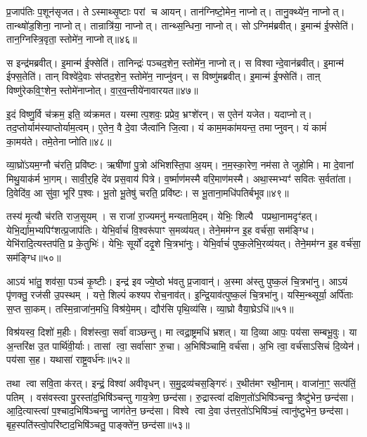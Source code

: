 प्र॒जाप॑तिः प॒शून॑सृजत।
तेऽस्माथ्सृ॒ष्टाः परां च आयन्।
तान॑ग्निष्टो॒मेन॒ नाप्नोत्।
तानु॒क्थ्ये॑न॒ नाप्नोत्।
तान्थ्षो॑ड॒शिना॒ नाप्नोत्।
तान्रात्रि॑या॒ नाप्नोत्।
तान्थ्स॒न्धिना॒ नाप्नोत्।
सोऽग्निम॑ब्रवीत्।
इ॒मान्म॑ ई॒फ्सेति॑।
तान॒ग्निस्त्रि॒वृता॒ स्तोमे॑न॒ नाप्नोत्॥४६॥

स इन्द्र॑मब्रवीत्।
इ॒मान्म॑ ई॒फ्सेति॑।
तानिन्द्रः॑ पञ्चद॒शेन॒ स्तोमे॑न॒ नाप्नोत्।
स विश्वान्दे॒वान॑ब्रवीत्।
इ॒मान्म॑ ईफ्स॒तेति॑।
तान् विश्वे॑दे॒वाः स॑प्तद॒शेन॒ स्तोमे॑न॒ नाप्नु॑वन्।
स विष्णु॑मब्रवीत्।
इ॒मान्म॑ ई॒फ्सेति॑।
ताऩ् विष्णु॑रेकवि॒ꣳ॒शेन॒ स्तोमे॑नाप्नोत्।
वा॒र॒व॒न्तीये॑नावारयत॥४७॥

इ॒दं विष्णु॒र्वि च॑क्रम॒ इति॒ व्य॑क्रमत।
यस्मात्प॒शवः॒ प्रप्रेव॒ भ्रꣳशे॑रन्।
स ए॒तेन॑ यजेत।
यदाप्नोत्।
तद॒प्तोर्याम॑स्याप्तोर्याम॒\-त्वम्।
ए॒तेन॒ वै दे॒वा जैत्वा॑नि जि॒त्वा।
यं काम॒मका॑मयन्त॒ तमाप्नुवन्।
यं कामं॑ का॒मय॑ते।
तमे॒तेनाप्नोति॥४८॥\anuvakamend[स्तोमे॑न॒ नाप्नो॑दवारयत॒ नव॑ च]

व्या॒घ्रो॑\-ऽयम॒ग्नौ च॑रति॒ प्रवि॑ष्टः।
ऋषी॑णां पु॒त्रो अ॑भिशस्ति॒पा अ॒यम्।
न॒म॒स्का॒रेण॒ नम॑सा ते जुहोमि।
मा दे॒वानां मिथु॒याक॑र्म भा॒गम्।
सावी॒र्॒हि दे॑व प्रस॒वाय॑ पित्रे।
व॒र्ष्माण॑मस्मै वरि॒माण॑मस्मै।
अथा॒स्मभ्यꣳ॑ सवितः स॒र्वता॑ता।
दि॒वेदि॑व॒ आ सु॑वा॒ भूरि॑ प॒श्वः।
भू॒तो भू॒तेषु॑ चरति॒ प्रवि॑ष्टः।
स भू॒ताना॒मधि॑पतिर्बभूव॥४९॥

तस्य॑ मृ॒त्यौ च॑रति राज॒सूयम्।
स राजा॑ रा॒ज्यमनु॑ मन्यतामि॒दम्।
येभिः॒ शिल्पै पप्रथा॒नामदृꣳ॑हत्।
येभि॒र्द्याम॒भ्यपिꣳ॑शत्प्र॒जाप॑तिः।
येभि॒र्वाचं॑ वि॒श्वरू॑पाꣳ स॒मव्य॑यत्।
तेने॒मम॑ग्न इ॒ह वर्च॑सा॒ सम॑ङ्ग्धि।
येभि॑रादि॒त्यस्तप॑ति॒ प्र के॒तुभिः॑।
येभिः॒ सूर्यो॑ ददृ॒शे चि॒त्रभा॑नुः।
येभि॒र्वाचं॑ पुष्क॒लेभि॒रव्य॑यत्।
तेने॒मम॑ग्न इ॒ह वर्च॑सा॒ सम॑ङ्ग्धि॥५०॥

आऽयं भा॑तु॒ शव॑सा॒ पञ्च॑ कृ॒ष्टीः।
इन्द्र॑ इव ज्ये॒ष्ठो भ॑वतु प्र॒जावान्॑।
अ॒स्मा अ॑स्तु पुष्क॒लं चि॒त्रभा॑नु।
आऽयं पृ॑णक्तु॒ रज॑सी उ॒पस्थम्।
यत्ते॒ शिल्पं॑ कश्यप रोच॒नाव॑त्।
इ॒न्द्रि॒याव॑त्पुष्क॒लं चि॒त्रभा॑नु।
यस्मि॒न्थ्सूर्या॒ अर्पि॑ताः स॒प्त सा॒कम्।
तस्मि॒न्राजा॑न॒मधि॒ विश्र॑ये॒मम्।
द्यौर॑सि पृथि॒व्य॑सि।
व्या॒घ्रो वैया॒घ्रे\-ऽधि॑॥५१॥

विश्र॑यस्व॒ दिशो॑ म॒हीः।
विश॑स्त्वा॒ सर्वा॑ वाञ्छन्तु।
मा त्वद्रा॒ष्ट्रमधि॑ भ्रशत्।
या दि॒व्या आपः॒ पय॑सा सम्बभू॒वुः।
या अ॒न्तरि॑क्ष उ॒त पार्थि॑वी॒र्याः।
तासां त्वा॒ सर्वा॑साꣳ रु॒चा।
अ॒भिषि॑ञ्चामि॒ वर्च॑सा।
अ॒भि त्वा॒ वर्च॑सा\-ऽसिचं दि॒व्येन॑।
पय॑सा स॒ह।
यथासा॑ राष्ट्र॒वर्ध॑नः॥५२॥

तथा त्वा सवि॒ता क॑रत्।
इन्द्रं॒ विश्वा॑ अवीवृधन्।
स॒मु॒द्रव्य॑चस॒ङ्गिरः॑।
र॒थीत॑मꣳ रथी॒नाम्।
वाजा॑ना॒ꣳ॒ सत्प॑तिं॒ पतिम्।
वस॑वस्त्वा पु॒रस्ता॑द॒भिषि॑ञ्चन्तु गाय॒त्रेण॒ छन्द॑सा।
रु॒द्रास्त्वा॑ दक्षिण॒तो॑\-ऽभिषि॑ञ्चन्तु॒ त्रैष्टु॑भेन॒ छन्द॑सा।
आ॒दि॒त्यास्त्वा॑ प॒श्चाद॒भिषि॑ञ्चन्तु॒ जाग॑तेन॒ छन्द॑सा।
विश्वे त्वा दे॒वा उ॑त्तर॒तो॑\-ऽभिषि॑ञ्चं॒ त्वानु॑ष्टुभेन॒ छन्द॑सा। 
बृह॒स्पति॑स्त्वो॒परि॑ष्टाद॒भिषि॑ञ्चतु॒ पाङ्क्ते॑न॒ छन्द॑सा॥५३॥


